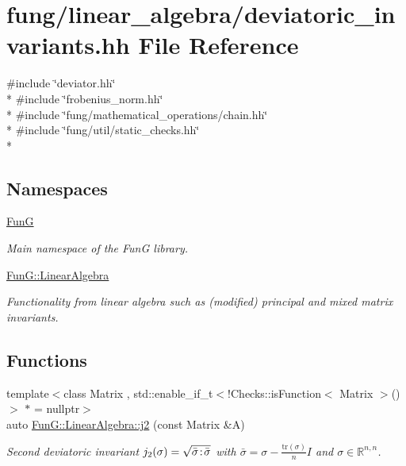 \hypertarget{deviatoric__invariants_8hh}{}\section{fung/linear\+\_\+algebra/deviatoric\+\_\+invariants.hh File Reference}
\label{deviatoric__invariants_8hh}
{\ttfamily \#include \char`\"{}deviator.\+hh\char`\"{}}\\*
{\ttfamily \#include \char`\"{}frobenius\+\_\+norm.\+hh\char`\"{}}\\*
{\ttfamily \#include \char`\"{}fung/mathematical\+\_\+operations/chain.\+hh\char`\"{}}\\*
{\ttfamily \#include \char`\"{}fung/util/static\+\_\+checks.\+hh\char`\"{}}\\*
\subsection*{Namespaces}
\begin{DoxyCompactItemize}
\item 
 \hyperlink{namespaceFunG}{FunG}
\begin{DoxyCompactList}\small\item\em Main namespace of the FunG library. \end{DoxyCompactList}\item 
 \hyperlink{namespaceFunG_1_1LinearAlgebra}{Fun\+G\+::\+Linear\+Algebra}
\begin{DoxyCompactList}\small\item\em Functionality from linear algebra such as (modified) principal and mixed matrix invariants. \end{DoxyCompactList}\end{DoxyCompactItemize}
\subsection*{Functions}
\begin{DoxyCompactItemize}
\item 
{\footnotesize template$<$class Matrix , std\+::enable\+\_\+if\+\_\+t$<$!\+Checks\+::is\+Function$<$ Matrix $>$()$>$ $\ast$  = nullptr$>$ }\\auto \hyperlink{group__InvariantGroup_ga9a2bc859fe1ae34b1a3ada91a39d69df}{Fun\+G\+::\+Linear\+Algebra\+::j2} (const Matrix \&A)
\begin{DoxyCompactList}\small\item\em Second deviatoric invariant $ j_2(\sigma)=\sqrt{\bar\sigma\negthinspace:\negthinspace\bar\sigma} $ with $\bar\sigma = \sigma - \frac{\mathrm{tr}(\sigma)}{n}I$ and $\sigma\in\mathbb{R}^{n,n}$. \end{DoxyCompactList}\end{DoxyCompactItemize}
